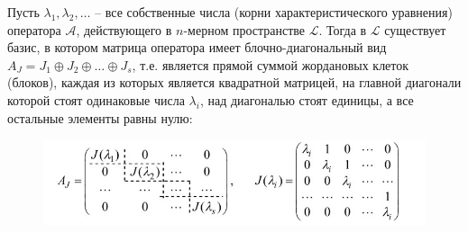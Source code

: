 \begin{theorem}
    Пусть $\lambda_1, \lambda_2, \ldots$ – все собственные числа (корни характеристического уравнения) оператора $\mathscr{A}$, действующего в $n$-мерном пространстве $\mathcal{L}$. Тогда в $\mathcal{L}$ существует базис, в котором матрица оператора имеет блочно-диагональный вид $A_J = J_1 \oplus J_2 \oplus \ldots \oplus J_s$, т.е. является прямой суммой жордановых клеток (блоков), каждая из которых является квадратной матрицей, на главной диагонали которой стоят одинаковые числа $\lambda_i$, над диагональю стоят единицы, а все остальные элементы равны нулю:

    \begin{figure}[H]
        \centering
        \includegraphics[scale=0.7]{images/module2/question27/1.jpg}
        \label{fig:picture_27_1}
    \end{figure} 
\end{theorem}
